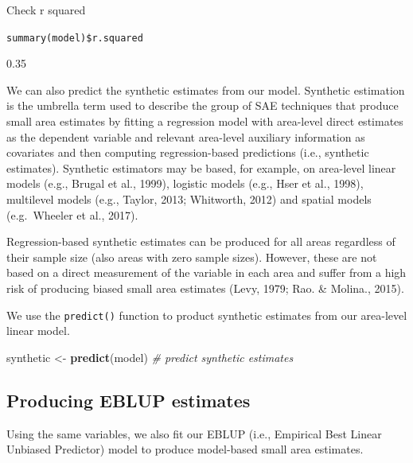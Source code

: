 \documentclass[
]{article}
\newenvironment{Shaded}{\begin{snugshade}}{\end{snugshade}}
\newcommand{\CommentTok}[1]{\textcolor[rgb]{0.56,0.35,0.01}{\textit{#1}}}
\newcommand{\KeywordTok}[1]{\textcolor[rgb]{0.13,0.29,0.53}{\textbf{#1}}}
\newcommand{\NormalTok}[1]{#1}
\newcommand{\OperatorTok}[1]{\textcolor[rgb]{0.81,0.36,0.00}{\textbf{#1}}}
\newcommand{\StringTok}[1]{\textcolor[rgb]{0.31,0.60,0.02}{#1}}
\begin{document}
Check r squared

\texttt{summary(model)\$r.squared}

0.35

We can also predict the synthetic estimates from our model. Synthetic
estimation is the umbrella term used to describe the group of SAE
techniques that produce small area estimates by fitting a regression
model with area-level direct estimates as the dependent variable and
relevant area-level auxiliary information as covariates and then
computing regression-based predictions (i.e., synthetic estimates).
Synthetic estimators may be based, for example, on area-level linear
models (e.g., Brugal et al., 1999), logistic models (e.g., Hser et al.,
1998), multilevel models (e.g., Taylor, 2013; Whitworth, 2012) and
spatial models (e.g.~Wheeler et al., 2017).

Regression-based synthetic estimates can be produced for all areas
regardless of their sample size (also areas with zero sample sizes).
However, these are not based on a direct measurement of the variable in
each area and suffer from a high risk of producing biased small area
estimates (Levy, 1979; Rao. \& Molina., 2015).

We use the \texttt{predict()} function to product synthetic estimates
from our area-level linear model.

\begin{Shaded}
\begin{Highlighting}[]
\NormalTok{synthetic <-}\StringTok{ }\KeywordTok{predict}\NormalTok{(model) }\CommentTok{# predict synthetic estimates}
\end{Highlighting}
\end{Shaded}

\begin{Shaded}
\end{Shaded}

\hypertarget{producing-eblup-estimates}{%
\subsection{Producing EBLUP estimates}\label{producing-eblup-estimates}}

Using the same variables, we also fit our EBLUP (i.e., Empirical Best
Linear Unbiased Predictor) model to produce model-based small area
estimates.
\end{document}
